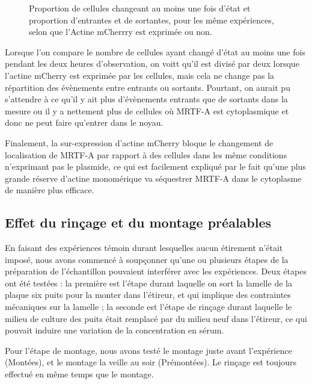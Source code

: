 \begin{figure}
\caption{\label{AMC}Répartition initiale pour des cellules issues des mêmes expériences exprimant ou non le plasmide Actine mCherry (683 cellules témoin et 538 cellules expriment l'Actine mCherry). **** : $p<10^{-4}$}\caption{\label{AMC_transloc}Proportion de cellules changeant au moins une fois d'état et proportion d'entrantes et de sortantes, pour les même expériences, selon que l'Actine mCherrry est exprimée ou non.}
\end{figure}

Lorsque l'on compare le nombre de cellules ayant changé d'état au moins une fois pendant les deux heures d'observation, on voitt qu'il est divisé par deux lorsque l'actine mCherry est exprimée par les cellules, mais cela ne change pas la répartition des évènements entre entrants ou sortants. 
Pourtant, on aurait pu s'attendre à ce qu'il y ait plus d'évènements entrants que de sortants dans la mesure ou il y a nettement plus de cellules où MRTF-A est cytoplasmique et donc ne peut faire qu'entrer dans le noyau. 

Finalement, la sur-expression d'actine mCherry bloque le changement de localisation de MRTF-A par rapport à des cellules dans les même conditions n'exprimant pas le plasmide, ce qui est facilement expliqué par le fait qu'une plus grande réserve d'actine monomérique va séquestrer MRTF-A dans le cytoplasme de manière plus efficace.

\subsection{Effet du rinçage et du montage préalables \label{Rinçage}}

En faisant des expériences témoin durant lesquelles aucun étirement n'était imposé, nous avons commencé à soupçonner qu'une ou plusieurs étapes de la préparation de l'échantillon pouvaient interférer avec les expériences. 
Deux étapes ont été testées : la première est l'étape durant laquelle on sort la lamelle de la plaque six puits pour la monter dans l'étireur, et qui implique des contraintes mécaniques sur la lamelle ; la seconde est l'étape de rinçage durant laquelle le milieu de culture des puits était remplacé par du milieu neuf dans l'étireur, ce qui pouvait induire une variation de la concentration en sérum. 

Pour l'étape de montage, nous avons testé le montage juste avant l'expérience (Montées), et le montage la veille au soir (Prémontées). 
Le rinçage est toujours effectué en même temps que le montage. 


